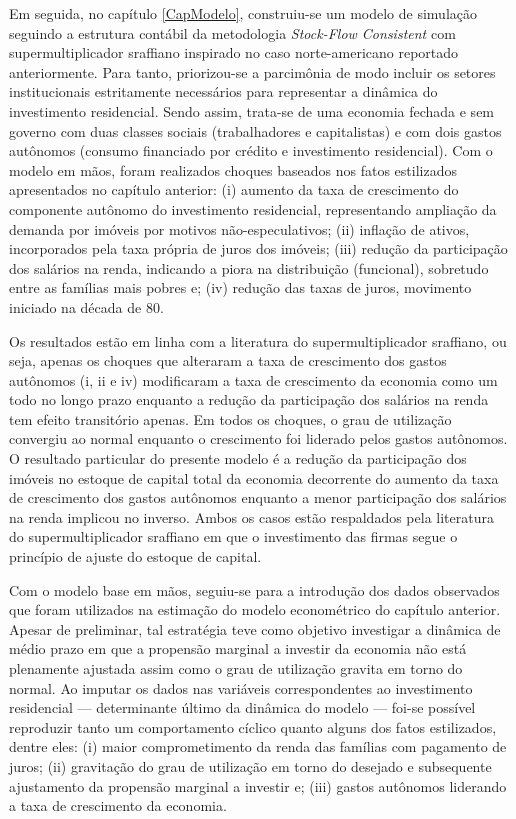 Em seguida, no capítulo \ref{CapModelo}, construiu-se um modelo de simulação seguindo a estrutura contábil da metodologia \textit{Stock-Flow Consistent} com supermultiplicador sraffiano inspirado no caso norte-americano reportado anteriormente.
Para tanto, priorizou-se a parcimônia de modo incluir os setores institucionais estritamente necessários para representar a dinâmica do investimento residencial.
Sendo assim, trata-se de uma economia fechada e sem governo com duas classes sociais (trabalhadores e capitalistas) e com dois gastos autônomos (consumo financiado por crédito e investimento residencial).
Com o modelo em mãos, foram realizados choques baseados nos fatos estilizados apresentados no capítulo anterior: (i) aumento da taxa de crescimento do componente autônomo do investimento residencial, representando ampliação da demanda por imóveis por motivos não-especulativos; (ii) inflação de ativos, incorporados pela taxa própria de juros dos imóveis; (iii) redução da participação dos salários na renda, indicando a piora na distribuição (funcional), sobretudo entre as famílias mais pobres e; (iv) redução das taxas de juros, movimento iniciado na década de 80.


Os resultados estão em linha com a literatura do supermultiplicador sraffiano, ou seja, apenas os choques que alteraram a taxa de crescimento dos gastos autônomos (i, ii e iv) modificaram a taxa de crescimento da economia como um todo no longo prazo enquanto a redução da participação dos salários na renda tem efeito transitório apenas.
Em todos os choques, o grau de utilização convergiu ao normal enquanto o crescimento foi liderado pelos gastos autônomos.
O resultado particular do presente modelo é a redução da participação dos imóveis no estoque de capital total da economia decorrente do aumento da taxa de crescimento dos gastos autônomos enquanto a menor participação dos salários na renda implicou no inverso.
Ambos os casos estão respaldados pela literatura do supermultiplicador sraffiano em que o investimento das firmas segue o princípio de ajuste do estoque de capital.


Com o modelo base em mãos, seguiu-se para a introdução dos dados observados que foram utilizados na estimação do modelo econométrico do capítulo anterior.
Apesar de preliminar, tal estratégia teve como objetivo investigar a dinâmica de médio prazo em que a propensão marginal a investir da economia não está plenamente ajustada assim como o grau de utilização gravita em torno do normal.
Ao imputar os dados nas variáveis correspondentes ao investimento residencial --- determinante último da dinâmica do modelo --- foi-se possível reproduzir tanto um comportamento cíclico quanto alguns dos fatos estilizados, dentre eles: (i) maior comprometimento da renda das famílias com pagamento de juros; (ii) gravitação do grau de utilização em torno do desejado e subsequente ajustamento da propensão marginal a investir e; (iii) gastos autônomos liderando a taxa de crescimento da economia.

